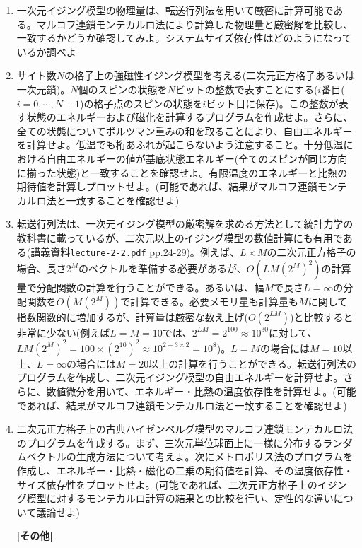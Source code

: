 \documentclass[11pt]{jarticle}
\begin{document}
\begin{enumerate}
\item 一次元イジング模型の物理量は、転送行列法を用いて厳密に計算可能である。マルコフ連鎖モンテカルロ法により計算した物理量と厳密解を比較し、一致するかどうか確認してみよ。システムサイズ依存性はどのようになっているか調べよ

\item サイト数$N$の格子上の強磁性イジング模型を考える(二次元正方格子あるいは一次元鎖)。$N$個のスピンの状態を$N$ビットの整数で表すことにする($i$番目($i=0,\cdots,N-1$)の格子点のスピンの状態を$i$ビット目に保存)。この整数が表す状態のエネルギーおよび磁化を計算するプログラムを作成せよ。さらに、全ての状態についてボルツマン重みの和を取ることにより、自由エネルギーを計算せよ。低温でも桁あふれが起こらないよう注意すること。十分低温における自由エネルギーの値が基底状態エネルギー(全てのスピンが同じ方向に揃った状態)と一致することを確認せよ。有限温度のエネルギーと比熱の期待値を計算しプロットせよ。(可能であれば、結果がマルコフ連鎖モンテカルロ法と一致することを確認せよ)

\item 転送行列法は、一次元イジング模型の厳密解を求める方法として統計力学の教科書に載っているが、二次元以上のイジング模型の数値計算にも有用である(講義資料{\tt lecture-2-2.pdf} pp.24-29)。例えば、$L\times M$の二次元正方格子の場合、長さ$2^M$のベクトルを準備する必要があるが、$O(LM(2^M)^2)$の計算量で分配関数の計算を行うことができる。あるいは、幅$M$で長さ$L=\infty$の分配関数を$O(M(2^M))$で計算できる。必要メモリ量も計算量も$M$に関して指数関数的に増加するが、計算量は厳密な数え上げ($O(2^{LM})$)と比較すると非常に少ない(例えば$L=M=10$では、$2^{LM}=2^{100}\approx 10^{30}$に対して、$LM(2^M)^2=100 \times (2^{10})^2 \approx 10^{2+3\times2} = 10^{8}$)。$L=M$の場合には$M=10$以上、$L=\infty$の場合には$M=20$以上の計算を行うことができる。転送行列法のプログラムを作成し、二次元イジング模型の自由エネルギーを計算せよ。さらに、数値微分を用いて、エネルギー・比熱の温度依存性を計算せよ。(可能であれば、結果がマルコフ連鎖モンテカルロ法と一致することを確認せよ)

\item 二次元正方格子上の古典ハイゼンベルグ模型のマルコフ連鎖モンテカルロ法のプログラムを作成する。まず、三次元単位球面上に一様に分布するランダムベクトルの生成方法について考えよ。次にメトロポリス法のプログラムを作成し、エネルギー・比熱・磁化の二乗の期待値を計算、その温度依存性・サイズ依存性をプロットせよ。(可能であれば、二次元正方格子上のイジング模型に対するモンテカルロ計算の結果との比較を行い、定性的な違いについて議論せよ)
  
  \hspace*{-2em} {\bf [その他]}


\end{enumerate}
\end{document}
